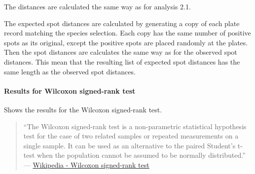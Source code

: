 \documentclass[letterpaper,10pt,english]{sphinxmanual}
\begin{document}
\begin{itemize}
\begin{quote}
\begin{figure}[htbp]
\label{user_manual:fig-spot-distances-inter}\end{figure}
\end{quote}

The distances are calculated the same way as for analysis 2.1.

\end{itemize}

The expected spot distances are calculated by generating a copy of
each plate record matching the species selection. Each copy has the
same number of positive spots as its original, except the positive
spots are placed randomly at the plates. Then the spot distances
are calculates the same way as for the observed spot distances. This
mean that the resulting list of expected spot distances has the same
length as the observed spot distances.


\paragraph{Results for Wilcoxon signed-rank test}
\label{user_manual:results-for-wilcoxon-signed-rank-test}
Shows the results for the Wilcoxon signed-rank test.
\begin{quote}

``The Wilcoxon signed-rank test is a non-parametric statistical
hypothesis test for the case of two related samples or repeated
measurements on a single sample. It can be used as an alternative
to the paired Student's t-test when the population cannot be assumed
to be normally distributed.'' ---
\href{http://en.wikipedia.org/wiki/Wilcoxon\_test}{Wikipedia - Wilcoxon signed-rank test}
\end{quote}
\end{document}
